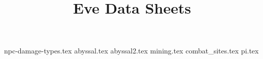 
\title{Eve Data Sheets}
\author{}
\date{}

\maketitle
\newpage
\tableofcontents
\newpage
\small
{npc-damage-types.tex}
\newpage
{abyssal.tex}
\newpage
{abyssal2.tex}
\newpage
{mining.tex}
\newpage
{combat_sites.tex}
\newpage
{pi.tex}
%
%
%
%
%



